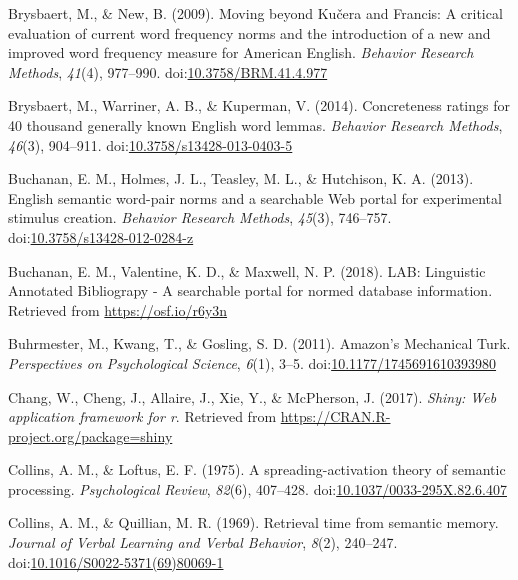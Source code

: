 \documentclass[english,,man]{apa6}
\theoremstyle{definition}
\theoremstyle{definition}
\theoremstyle{definition}
\theoremstyle{remark}
\begin{document}
\leavevmode\hypertarget{ref-Brysbaert2009}{}%
Brysbaert, M., \& New, B. (2009). Moving beyond Kučera and Francis: A
critical evaluation of current word frequency norms and the introduction
of a new and improved word frequency measure for American English.
\emph{Behavior Research Methods}, \emph{41}(4), 977--990.
doi:\href{https://doi.org/10.3758/BRM.41.4.977}{10.3758/BRM.41.4.977}

\leavevmode\hypertarget{ref-Brysbaert2013}{}%
Brysbaert, M., Warriner, A. B., \& Kuperman, V. (2014). Concreteness
ratings for 40 thousand generally known English word lemmas.
\emph{Behavior Research Methods}, \emph{46}(3), 904--911.
doi:\href{https://doi.org/10.3758/s13428-013-0403-5}{10.3758/s13428-013-0403-5}

\leavevmode\hypertarget{ref-Buchanan2013}{}%
Buchanan, E. M., Holmes, J. L., Teasley, M. L., \& Hutchison, K. A.
(2013). English semantic word-pair norms and a searchable Web portal for
experimental stimulus creation. \emph{Behavior Research Methods},
\emph{45}(3), 746--757.
doi:\href{https://doi.org/10.3758/s13428-012-0284-z}{10.3758/s13428-012-0284-z}

\leavevmode\hypertarget{ref-Buchanan2018}{}%
Buchanan, E. M., Valentine, K. D., \& Maxwell, N. P. (2018). LAB:
Linguistic Annotated Bibliograpy - A searchable portal for normed
database information. Retrieved from \url{https://osf.io/r6y3n}

\leavevmode\hypertarget{ref-Buhrmester2011}{}%
Buhrmester, M., Kwang, T., \& Gosling, S. D. (2011). Amazon's Mechanical
Turk. \emph{Perspectives on Psychological Science}, \emph{6}(1), 3--5.
doi:\href{https://doi.org/10.1177/1745691610393980}{10.1177/1745691610393980}

\leavevmode\hypertarget{ref-R-shiny}{}%
Chang, W., Cheng, J., Allaire, J., Xie, Y., \& McPherson, J. (2017).
\emph{Shiny: Web application framework for r}. Retrieved from
\url{https://CRAN.R-project.org/package=shiny}

\leavevmode\hypertarget{ref-Collins1975}{}%
Collins, A. M., \& Loftus, E. F. (1975). A spreading-activation theory
of semantic processing. \emph{Psychological Review}, \emph{82}(6),
407--428.
doi:\href{https://doi.org/10.1037/0033-295X.82.6.407}{10.1037/0033-295X.82.6.407}

\leavevmode\hypertarget{ref-Collins1969}{}%
Collins, A. M., \& Quillian, M. R. (1969). Retrieval time from semantic
memory. \emph{Journal of Verbal Learning and Verbal Behavior},
\emph{8}(2), 240--247.
doi:\href{https://doi.org/10.1016/S0022-5371(69)80069-1}{10.1016/S0022-5371(69)80069-1}
\end{document}
